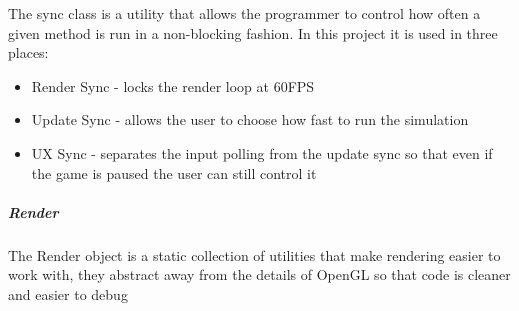 			The sync class is a utility that allows the programmer to control how often a given method is run in a non-blocking fashion. In this project it is used in three places:
			
			\begin{itemize}
			\item Render Sync - locks the render loop at 60FPS
			
			\item Update Sync - allows the user to choose how fast to run the simulation
			
			\item UX Sync - separates the input polling from the update sync so that even if the game is paused the user can still control it
		\end{itemize}
		
		\subparagraph{Render} 
		
			The Render object is a static collection of utilities that make rendering easier to work with, they abstract away from the details of OpenGL so that code is cleaner and easier to debug
	